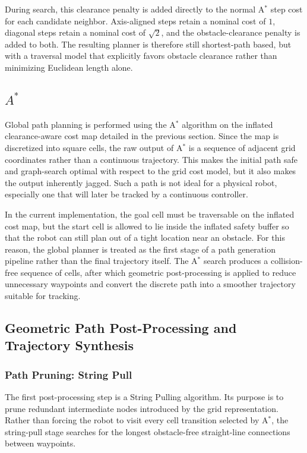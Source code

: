 \documentclass[11pt]{article}
\begin{document}
During search, this clearance penalty is added directly to the normal A$^{*}$ step cost for each candidate neighbor.
Axis-aligned steps retain a nominal cost of $1$, diagonal steps retain a nominal cost of $\sqrt{2}$, and the
obstacle-clearance penalty is added to both. The resulting planner is therefore still shortest-path based, but with a
traversal model that explicitly favors obstacle clearance rather than minimizing Euclidean length alone.

\subsection{\texorpdfstring{$A^{*}$}{A*}}
\noindent Global path planning is performed using the A$^{*}$ algorithm on the inflated clearance-aware cost map
          detailed in the previous section. Since the map is discretized into square cells, the raw output of A$^{*}$ is
          a sequence of adjacent grid coordinates rather than a continuous trajectory. This makes the initial path safe
          and graph-search optimal with respect to the grid cost model, but it also makes the output inherently jagged.
          Such a path is not ideal for a physical robot, especially one that will later be tracked by a continuous
          controller.

In the current implementation, the goal cell must be traversable on the inflated cost map, but the start cell is allowed
to lie inside the inflated safety buffer so that the robot can still plan out of a tight location near an obstacle. For
this reason, the global planner is treated as the first stage of a path generation pipeline rather than the final
trajectory itself. The A$^{*}$ search produces a collision-free sequence of cells, after which geometric post-processing
is applied to reduce unnecessary waypoints and convert the discrete path into a smoother trajectory suitable for
tracking.

\subsection{Geometric Path Post-Processing and Trajectory Synthesis}
\subsubsection{Path Pruning: String Pull}
\noindent The first post-processing step is a String Pulling algorithm. Its purpose is to prune redundant intermediate
          nodes introduced by the grid representation. Rather than forcing the robot to visit every cell transition
          selected by A$^{*}$, the string-pull stage searches for the longest obstacle-free straight-line connections
          between waypoints.
\end{document}
